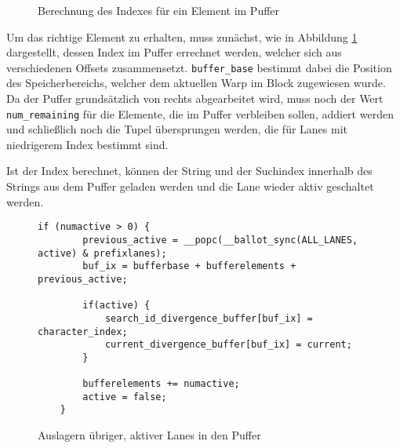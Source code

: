 \begin{figure}[ht]
	\caption{Berechnung des Indexes für ein Element im Puffer}
	\label{fig:buffer_index}
\end{figure}

Um das richtige Element zu erhalten, muss zunächst, wie in Abbildung \ref{fig:buffer_index} dargestellt, dessen Index im Puffer errechnet werden, welcher sich aus verschiedenen Offsets zusammensetzt.
\texttt{buffer\_base} bestimmt dabei die Position des Speicherbereichs, welcher dem aktuellen Warp im Block zugewiesen wurde.
Da der Puffer grundsätzlich von rechts abgearbeitet wird, muss noch der Wert \texttt{num\_remaining} für die Elemente, die im Puffer verbleiben sollen, addiert werden und schließlich noch die Tupel übersprungen werden, die für Lanes mit niedrigerem Index bestimmt sind.

Ist der Index berechnet, können der String und der Suchindex innerhalb des Strings aus dem Puffer geladen werden und die Lane wieder aktiv geschaltet werden.

\begin{figure}[ht]
	\begin{lstlisting}[language=MyC++]
	if (numactive > 0) {
		previous_active = __popc(__ballot_sync(ALL_LANES, active) & prefixlanes);
		buf_ix = bufferbase + bufferelements + previous_active;
		
		if(active) {
			search_id_divergence_buffer[buf_ix] = character_index;
			current_divergence_buffer[buf_ix] = current;
		}
		
		bufferelements += numactive;
		active = false;
	}
	\end{lstlisting}
	\caption{Auslagern übriger, aktiver Lanes in den Puffer}
	\label{flush_code}
\end{figure}

